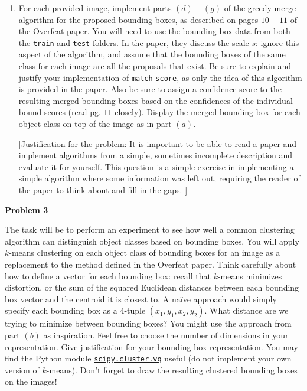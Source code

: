 \documentclass[12pt]{article}
\newcommand{\probnum}[1]
{\large {\bf Problem {#1}}}
\begin{document}
\begin{enumerate}
\item For each provided image, implement parts $(d)-(g)$ of the greedy merge algorithm for the proposed bounding boxes, as described on pages $10-11$ of the \href{http://arxiv.org/pdf/1312.6229v4.pdf}{Overfeat paper}. You will need to use the bounding box data from both the \texttt{train} and \texttt{test} folders. In the paper, they discuss the scale $s$: ignore this aspect of the algorithm, and assume that the bounding boxes of the same class for each image are all the proposals that exist. Be sure to explain and justify your implementation of \texttt{match$\_$score}, as only the idea of this algorithm is provided in the paper. Also be sure to assign a confidence score to the resulting merged bounding boxes based on the confidences of the individual bound scores (read pg. $11$ closely). Display the merged bounding box for each object class on top of the image as in part $(a)$.

[Justification for the problem: It is important to be able to read a paper and implement algorithms from a simple, sometimes incomplete description and evaluate it for yourself. This question is a simple exercise in implementing a simple algorithm where some information was left out, requiring the reader of the paper to think about and fill in the gaps. ]

\end{enumerate}

\probnum{3}

The task will be to perform an experiment to see how well a common clustering algorithm can distinguish object classes based on bounding boxes. You will apply $k$-means clustering on each object class of bounding boxes for an image as a replacement to the method defined in the Overfeat paper. Think carefully about how to define a vector for each bounding box: recall that $k$-means minimizes distortion, or the sum of the squared Euclidean distances between each bounding box vector and the centroid it is closest to. A na{\"i}ve approach would simply specify each bounding box as a $4$-tuple $(x_1, y_1, x_2, y_2)$. What distance are we trying to minimize between bounding boxes? You might use the approach from part $(b)$ as inspiration. Feel free to choose the number of dimensions in your representation. Give justification for your bounding box representation. You may find the Python module \href{http://docs.scipy.org/doc/scipy/reference/cluster.vq.html}{\texttt{scipy.cluster.vq}} useful (do not implement your own version of $k$-means). Don't forget to draw the resulting clustered bounding boxes on the images!
\end{document}
